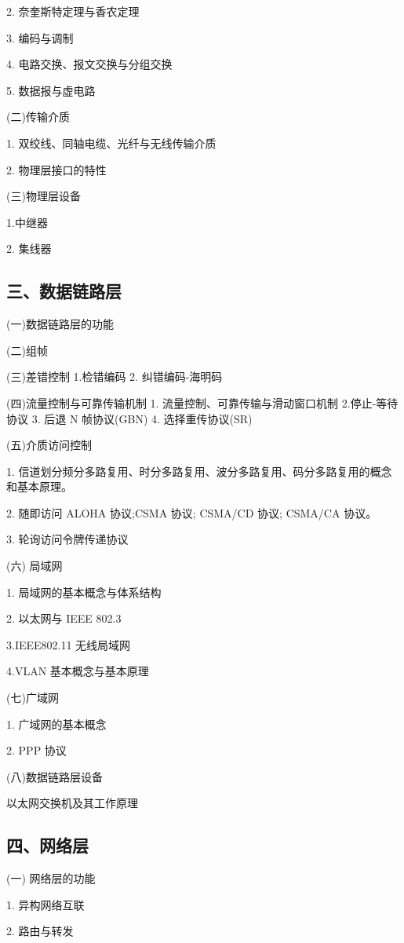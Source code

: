 \documentclass[10pt]{article}
\begin{document}
2. 奈奎斯特定理与香农定理

3. 编码与调制

4. 电路交换、报文交换与分组交换

5. 数据报与虚电路

(二)传输介质

1. 双绞线、同轴电缆、光纤与无线传输介质 

2. {\color{red} 物理层接口的特性}

(三)物理层设备

1.中继器 

2. 集线器

\subsection*{三、数据链路层}

(一)数据链路层的功能

(二)组帧 

(三)差错控制 1.检错编码 2.{\color{red} 纠错编码-海明码}

(四)流量控制与可靠传输机制 1. 流量控制、可靠传输与滑动窗口机制 2.停止-等待协议 3. 后退 N 帧协议(GBN) 4. 选择重传协议(SR)

(五)介质访问控制 

1. {\color{red}信道划分频分多路复用、时分多路复用、波分多路复用、码分多路复用的概念和基本原理}。 

2. {\color{red} 随即访问 ALOHA 协议;CSMA 协议;} CSMA/CD 协议; CSMA/CA 协议。 

3. 轮询访问令牌传递协议

(六) 局域网

1. 局域网的基本概念与体系结构

2. 以太网与 IEEE 802.3 

3.IEEE802.11 无线局域网 

4.VLAN 基本概念与基本原理

(七)广域网

1. 广域网的基本概念

2.{\color{red} PPP 协议}

(八)数据链路层设备

{\color{red}以太网交换机及其工作原理}

\subsection*{四、网络层}

(一) 网络层的功能

1. 异构网络互联

2. 路由与转发
\end{document}
